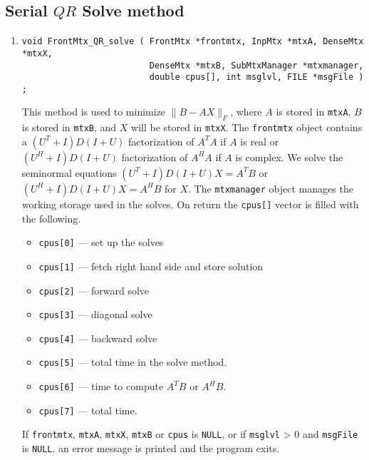 \subsection{Serial $QR$ Solve method}
\label{subsection:FrontMtx:proto:QRsolve-serial}
\par
\begin{enumerate}
\item
\begin{verbatim}
void FrontMtx_QR_solve ( FrontMtx *frontmtx, InpMtx *mtxA, DenseMtx *mtxX, 
                         DenseMtx *mtxB, SubMtxManager *mtxmanager,
                         double cpus[], int msglvl, FILE *msgFile ) ;
\end{verbatim}
This method is used to minimize $\|B - AX\|_F$, where
$A$ is stored in {\tt mtxA},
$B$ is stored in {\tt mtxB},
and $X$ will be stored in {\tt mtxX}.
The {\tt frontmtx} object contains a
$(U^T+I)D(I+U)$ factorization of $A^TA$ if $A$ is real
or
$(U^H+I)D(I+U)$ factorization of $A^HA$ if $A$ is complex.
We solve the seminormal equations
$(U^T+I)D(I+U)X = A^TB$ or $(U^H+I)D(I+U)X = A^HB$
for $X$.
The {\tt mtxmanager} object manages the working storage 
used in the solves.
On return the {\tt cpus[]} vector is filled with the following.
\begin{itemize}
\item
{\tt cpus[0]} --- set up the solves
\item
{\tt cpus[1]} --- fetch right hand side and store solution
\item
{\tt cpus[2]} --- forward solve
\item
{\tt cpus[3]} --- diagonal solve
\item
{\tt cpus[4]} --- backward solve
\item
{\tt cpus[5]} --- total time in the solve method.
\item
{\tt cpus[6]} --- time to compute $A^TB$ or $A^HB$.
\item
{\tt cpus[7]} --- total time.
\end{itemize}
\par {}
If {\tt frontmtx}, {\tt mtxA}, {\tt mtxX}, {\tt mtxB} or {\tt cpus} 
is {\tt NULL},
or if {\tt msglvl} > 0 and {\tt msgFile} is {\tt NULL},
an error message is printed and the program exits.
\end{enumerate}
\par
